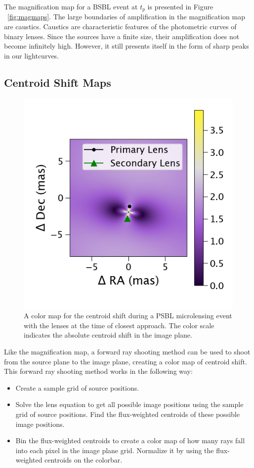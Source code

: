 \documentclass[twocolumn]{aastex701}
\begin{document}
The magnification map for a BSBL event at $t_p$ is presented in Figure ~\ref{fig:magmaps}. The large boundaries of amplification in the magnification map are caustics. Caustics are characteristic features of the photometric curves of binary lenses. Since the sources have a finite size, their amplification does not become infinitely high. However, it still presents itself in the form of sharp peaks in our lightcurves. 

\subsection{Centroid Shift Maps}
\label{sec:results_asm}

\begin{figure}
    \centering
    \includegraphics[width= 0.48 \textwidth]{figures/csmap.png}
    \caption{A color map for the centroid shift during a PSBL microlensing event with the lenses at the time of closest approach. The color scale indicates the absolute centroid shift in the image plane.}
    \label{fig:csmap}
\end{figure}

Like the magnification map, a forward ray shooting method can be used to shoot from the source plane to the image plane, creating a color map of centroid shift. This forward ray shooting method works in the following way:


\begin{itemize}
    \item Create a sample grid of source positions. 
    \item Solve the lens equation to get all possible image positions using the sample grid of source positions. Find the flux-weighted centroids of these possible image positions.
    \item Bin the flux-weighted centroids to create a color map of how many rays fall into each pixel in the image plane grid. Normalize it by using the flux-weighted centroids on the colorbar. 
\end{itemize}
\end{document}
